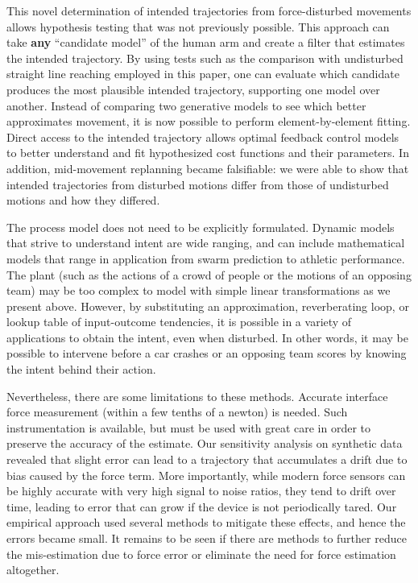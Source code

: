 This novel determination of intended trajectories from force-disturbed movements allows hypothesis testing that was not previously possible. This approach can take \textbf{any} ``candidate model'' of the human arm and create a filter that estimates the intended trajectory. By using tests such as the comparison with undisturbed straight line reaching employed in this paper, one can evaluate which candidate produces the most plausible intended trajectory, supporting one model over another.  Instead of comparing two generative models to see which better approximates movement, it is now possible to perform element-by-element fitting. Direct access to the intended trajectory allows optimal feedback control models to better understand and fit hypothesized cost functions and their parameters. In addition, mid-movement replanning became falsifiable: we were able to show that intended trajectories from disturbed motions differ from those of undisturbed motions and how they differed.

The process model does not need to be explicitly formulated. Dynamic models that strive to understand intent are wide ranging, and can include mathematical models that range in application from swarm prediction to athletic performance. The plant (such as the actions of a crowd of people or the motions of an opposing team) may be too complex to model with simple linear transformations as we present above. However, by substituting an approximation, reverberating loop, or lookup table of input-outcome tendencies, it is possible in a variety of applications to obtain the intent, even when disturbed. In other words, it may be possible to intervene before a car crashes or an opposing team scores by knowing the intent behind their action.

Nevertheless, there are some limitations to these methods. Accurate interface force measurement (within a few tenths of a newton) is needed. Such instrumentation is available, but must be used with great care in order to preserve the accuracy of the estimate. Our sensitivity analysis on synthetic data revealed that slight error can lead to a trajectory that accumulates a drift due to bias caused by the force term. More importantly, while modern force sensors can be highly accurate with very high signal to noise ratios, they tend to drift over time, leading to error that can grow if the device is not periodically tared. Our empirical approach used several methods to mitigate these effects, and hence the errors became small. It remains to be seen if there are methods to further reduce the mis-estimation due to force error or eliminate the need for force estimation altogether.  

